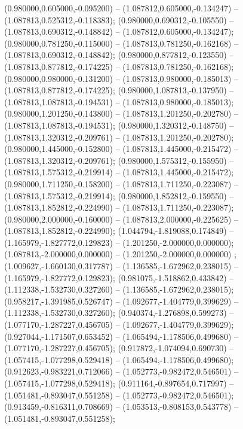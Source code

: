  (0.980000,0.605000,-0.095200) -- (1.087812,0.605000,-0.134247) -- (1.087813,0.525312,-0.118383);
 (0.980000,0.690312,-0.105550) -- (1.087813,0.690312,-0.148842) -- (1.087812,0.605000,-0.134247);
 (0.980000,0.781250,-0.115000) -- (1.087813,0.781250,-0.162168) -- (1.087813,0.690312,-0.148842);
 (0.980000,0.877812,-0.123550) -- (1.087813,0.877812,-0.174225) -- (1.087813,0.781250,-0.162168);
 (0.980000,0.980000,-0.131200) -- (1.087813,0.980000,-0.185013) -- (1.087813,0.877812,-0.174225);
 (0.980000,1.087813,-0.137950) -- (1.087813,1.087813,-0.194531) -- (1.087813,0.980000,-0.185013);
 (0.980000,1.201250,-0.143800) -- (1.087813,1.201250,-0.202780) -- (1.087813,1.087813,-0.194531);
 (0.980000,1.320312,-0.148750) -- (1.087813,1.320312,-0.209761) -- (1.087813,1.201250,-0.202780);
 (0.980000,1.445000,-0.152800) -- (1.087813,1.445000,-0.215472) -- (1.087813,1.320312,-0.209761);
 (0.980000,1.575312,-0.155950) -- (1.087813,1.575312,-0.219914) -- (1.087813,1.445000,-0.215472);
 (0.980000,1.711250,-0.158200) -- (1.087813,1.711250,-0.223087) -- (1.087813,1.575312,-0.219914);
 (0.980000,1.852812,-0.159550) -- (1.087813,1.852812,-0.224990) -- (1.087813,1.711250,-0.223087);
 (0.980000,2.000000,-0.160000) -- (1.087813,2.000000,-0.225625) -- (1.087813,1.852812,-0.224990);
 (1.044794,-1.819088,0.174849) -- (1.165979,-1.827772,0.129823) -- (1.201250,-2.000000,0.000000);
 (1.087813,-2.000000,0.000000) -- (1.201250,-2.000000,0.000000) ;
 (1.009627,-1.660130,0.317787) -- (1.136585,-1.672962,0.238015) -- (1.165979,-1.827772,0.129823);
 (0.981075,-1.518862,0.433842) -- (1.112338,-1.532730,0.327260) -- (1.136585,-1.672962,0.238015);
 (0.958217,-1.391985,0.526747) -- (1.092677,-1.404779,0.399629) -- (1.112338,-1.532730,0.327260);
 (0.940374,-1.276898,0.599273) -- (1.077170,-1.287227,0.456705) -- (1.092677,-1.404779,0.399629);
 (0.927044,-1.171507,0.653452) -- (1.065494,-1.178506,0.499680) -- (1.077170,-1.287227,0.456705);
 (0.917872,-1.074094,0.690730) -- (1.057415,-1.077298,0.529418) -- (1.065494,-1.178506,0.499680);
 (0.912623,-0.983221,0.712066) -- (1.052773,-0.982472,0.546501) -- (1.057415,-1.077298,0.529418);
 (0.911164,-0.897654,0.717997) -- (1.051481,-0.893047,0.551258) -- (1.052773,-0.982472,0.546501);
 (0.913459,-0.816311,0.708669) -- (1.053513,-0.808153,0.543778) -- (1.051481,-0.893047,0.551258);
